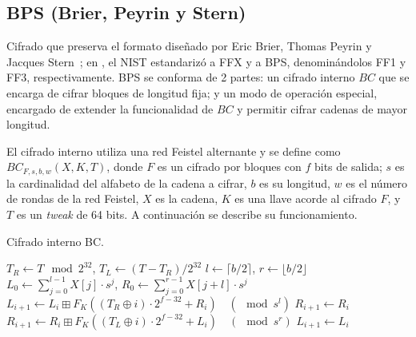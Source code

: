 %
%

\subsection{BPS (Brier, Peyrin y Stern)}

Cifrado que preserva el formato diseñado por Eric Brier, Thomas Peyrin y
Jacques Stern~\cite{bps}; en \cite{nist_fpe}, el NIST estandarizó a FFX y a
BPS, denominándolos FF1 y FF3, respectivamente. BPS se conforma de 2 partes: un
cifrado interno $BC$ que se encarga de cifrar bloques de longitud fija; y un modo
de operación especial, encargado de extender la funcionalidad de $BC$ y permitir
cifrar cadenas de mayor longitud.

El cifrado interno utiliza una red Feistel alternante y se define como
$BC_{F,s,b,w}(X,K,T)$, donde $F$ es un cifrado por bloques con $f$ bits de
salida; $s$ es la cardinalidad del alfabeto de la cadena a cifrar, $b$ es su
longitud, $w$ es el número de rondas de la red Feistel, $X$ es la cadena, $K$ es
una llave acorde al cifrado $F$, y $T$ es un \textit{tweak} de 64 bits. A
continuación se describe su funcionamiento.

\begin{algorithm}
  \caption{\label{proceso_bc} Cifrado interno BC.}
  \begin{algorithmic}[1]
      \State $ T_R \gets T \mod 2^{32} $,
        $ T_L \gets (T - T_R) / 2^{32} $
      \State $ l \gets \lceil b/2 \rceil $,
        $ r \gets \lfloor b/2 \rfloor $
      \State $ L_0 \gets \sum_{j=0}^{l-1} X[j] \cdot s^j $,
        $ R_0 \gets \sum_{j=0}^{r-1} X[j+l] \cdot s^j $
          \State $ L_{i+1} \gets L_i \boxplus F_K((T_R \oplus i)
            \cdot 2^{f-32} + R_i)\quad (\mod s^l) $
          \State $ R_{i+1} \gets R_i $
        \Else
          \State $ R_{i+1} \gets R_i \boxplus F_K((T_L \oplus i)
            \cdot 2^{f-32} + L_i)\quad (\mod s^r) $
          \State $ L_{i+1} \gets L_i $
        \EndIf
      \EndFor
      \State {}
    \EndFunction
  \end{algorithmic}
\end{algorithm}

